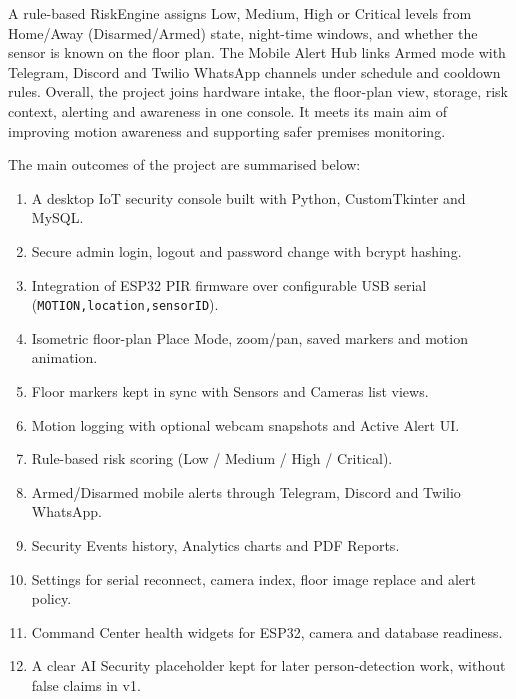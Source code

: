 \documentclass[12pt,a4paper]{report}
\begin{document}
A rule-based RiskEngine assigns Low, Medium, High or Critical levels from Home/Away (Disarmed/Armed) state, night-time windows, and whether the sensor is known on the floor plan. The Mobile Alert Hub links Armed mode with Telegram, Discord and Twilio WhatsApp channels under schedule and cooldown rules. Overall, the project joins hardware intake, the floor-plan view, storage, risk context, alerting and awareness in one console. It meets its main aim of improving motion awareness and supporting safer premises monitoring.

The main outcomes of the project are summarised below:
\begin{enumerate}

    \item A desktop IoT security console built with Python, CustomTkinter and MySQL.

    \item Secure admin login, logout and password change with bcrypt hashing.

    \item Integration of ESP32 PIR firmware over configurable USB serial (\texttt{MOTION,location,sensorID}).

    \item Isometric floor-plan Place Mode, zoom/pan, saved markers and motion animation.

    \item Floor markers kept in sync with Sensors and Cameras list views.

    \item Motion logging with optional webcam snapshots and Active Alert UI.

    \item Rule-based risk scoring (Low / Medium / High / Critical).

    \item Armed/Disarmed mobile alerts through Telegram, Discord and Twilio WhatsApp.

    \item Security Events history, Analytics charts and PDF Reports.

    \item Settings for serial reconnect, camera index, floor image replace and alert policy.

    \item Command Center health widgets for ESP32, camera and database readiness.

    \item A clear AI Security placeholder kept for later person-detection work, without false claims in v1.

\end{enumerate}
\end{document}
